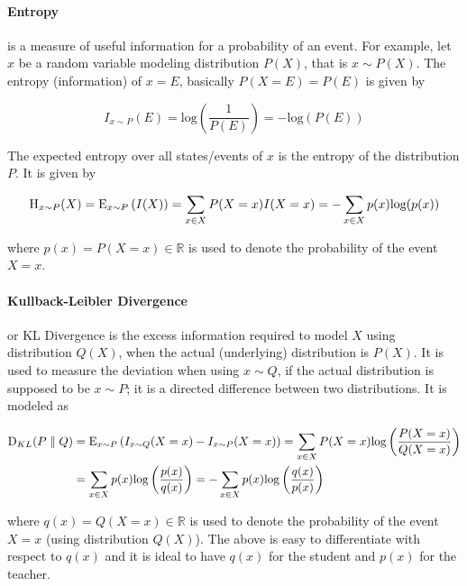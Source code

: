 \paragraph{Entropy} is a measure of useful information for a
probability of an event. For example, let $x$ be a random variable
modeling distribution $P(X)$, that is $x \sim P(X)$. The entropy
(information) of $x = E$, basically $P(X = E) = P(E)$ is given by

\begin{equation}
    I_{x \sim P}(E) = \mathrm{log}\left(\frac{1}{P(E)}\right)
        = -\mathrm{log}\left(P(E)\right)
\end{equation}

The expected entropy over all states/events of $x$ is the entropy of
the distribution $P$. It is given by

\begin{equation}
    \textup{H}_{x \sim P}(X) = \textup{E}_{x \sim P}\left(I(X)\right) 
        = \sum_{x \in X} P(X = x) I(X = x)
        = -\sum_{x \in X} p(x) \textup{log}(p(x))
\end{equation}

where $p(x) = P(X = x) \in \mathbb{R}$ is used to denote the
probability of the event $X = x$.

\paragraph{Kullback-Leibler Divergence} or KL Divergence is the excess
information required to model $X$ using distribution $Q(X)$, when the
actual (underlying) distribution is $P(X)$. It is used to measure the
deviation when using $x \sim Q$, if the actual distribution is
supposed to be $x \sim P$; it is a directed difference between two
distributions. It is modeled as

\begin{align}
    \textup{D}_{KL}(P \parallel Q) &= \textup{E}_{x \sim P} \left(
            I_{x\sim Q}(X = x) - I_{x\sim P}(X = x)\right)
        = \sum_{x \in X} P(X = x) \mathrm{log}\left(
            \frac{P(X = x)}{Q(X = x)}\right) \nonumber \\
        &= \sum_{x \in X} p(x) \mathrm{log}\left(\frac{p(x)}{q(x)}
            \right)
        = -\sum_{x \in X} p(x) \mathrm{log}\left(\frac{q(x)}{p(x)}
            \right)
\end{align}

where $q(x) = Q(X = x) \in \mathbb{R}$ is used to denote the
probability of the event $X = x$ (using distribution $Q(X)$). The
above is easy to differentiate with respect to $q(x)$ and it is
ideal to have $q(x)$ for the student and $p(x)$ for the teacher.

